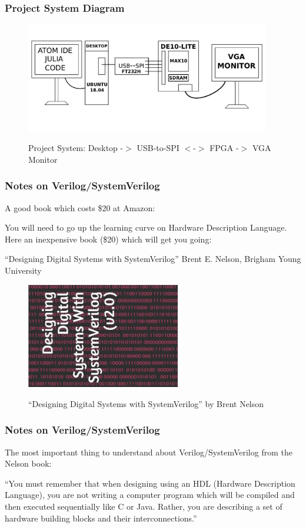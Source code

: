 \documentclass{beamer}
\begin{document}
\begin{frame}
\frametitle{Project System Diagram}

\begin{figure}[h]
	\centering
	\includegraphics[width=0.95\textwidth]{graphics/project_system}
	\centering\bfseries
	\caption{Project System: Desktop -$>$ USB-to-SPI $<$-$>$ FPGA -$>$ VGA Monitor}
\end{figure}

\end{frame}

\begin{frame}
\frametitle{Notes on Verilog/SystemVerilog}

A good book which costs \$20 at Amazon:

You will need to go up the learning curve on Hardware Description Language.
Here an inexpensive book (\$20) which will get you going:

``Designing Digital Systems with SystemVerilog''
Brent E. Nelson, Brigham Young University

\begin{figure}[h]
	\centering
	\includegraphics[width=0.60\textwidth]{graphics/systemverilog.png}
	\centering\bfseries
	\caption{``Designing Digital Systems with SystemVerilog'' by Brent Nelson}
\end{figure}
\end{frame}

\begin{frame}
\frametitle{Notes on Verilog/SystemVerilog}

The most important thing to understand about Verilog/SystemVerilog from the Nelson book:

``You must remember that when designing using an HDL (Hardware Description Language), you are not writing a computer program which will be compiled and then executed sequentially like C or Java.  Rather, you are describing a set of hardware building blocks and their interconnections.''

\end{frame}
\end{document}
